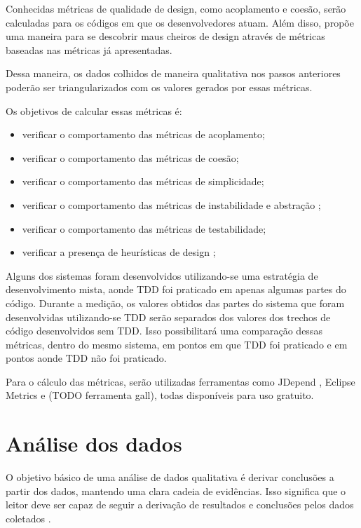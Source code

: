 Conhecidas métricas de qualidade de design, como acoplamento e coesão, serão calculadas para os códigos em que os desenvolvedores
atuam. Além disso, \cite{lanza} propõe uma maneira para se descobrir maus cheiros de design através de métricas baseadas nas métricas
já apresentadas.

Dessa maneira, os dados colhidos de maneira qualitativa nos passos anteriores poderão ser triangularizados com os valores gerados
por essas métricas.

Os objetivos de calcular essas métricas é:

\begin{itemize}
	\item verificar o comportamento das métricas de acoplamento;
	\item verificar o comportamento das métricas de coesão;
	\item verificar o comportamento das métricas de simplicidade;
	\item verificar o comportamento das métricas de instabilidade e abstração \cite{bobmartin-oodmetrics};
	\item verificar o comportamento das métricas de testabilidade;
	\item verificar a presença de heurísticas de design \cite{lanza};
\end{itemize}

Alguns dos sistemas foram desenvolvidos utilizando-se uma estratégia de desenvolvimento mista, aonde TDD foi praticado em apenas algumas partes
do código. Durante a medição, os valores obtidos das partes do sistema que foram desenvolvidas utilizando-se TDD serão separados dos valores 
dos trechos de código desenvolvidos sem TDD. Isso possibilitará uma comparação dessas métricas, 
dentro do mesmo sistema, em pontos em que TDD foi praticado e em pontos aonde TDD não foi praticado.

Para o cálculo das métricas, serão utilizadas ferramentas como JDepend \cite{jdepend}, Eclipse Metrics \cite{eclipse-metrics} e (TODO ferramenta gall),
todas disponíveis para uso gratuito.

\section{Análise dos dados}
\label{sec:planejamento-analise}

O objetivo básico de uma análise de dados qualitativa é derivar conclusões a partir dos dados, mantendo uma clara cadeia de evidências.
Isso significa que o leitor deve ser capaz de seguir a derivação de resultados e conclusões pelos dados coletados \cite{yin}.

